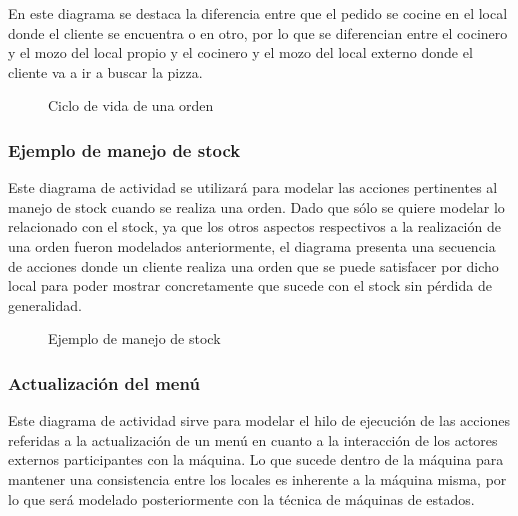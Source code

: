 \documentclass[a4paper,10pt]{article}
\begin{document}
En este diagrama se destaca la diferencia entre que el pedido se cocine en el local donde el cliente se encuentra o en otro, por lo que se 
diferencian entre el cocinero y el mozo del local propio y el cocinero y el mozo del local externo donde el cliente va a ir a buscar la pizza.

\begin{figure}[H]
\centering
{}
\caption{Ciclo de vida de una orden}
\end{figure}

\bigskip

\subsubsection*{Ejemplo de manejo de stock}

Este diagrama de actividad se utilizar\'a para modelar las acciones pertinentes al manejo de stock cuando se realiza una orden. Dado que sólo
se quiere modelar lo relacionado con el stock, ya que los otros aspectos respectivos a la realizaci\'on de una orden fueron modelados anteriormente,
el diagrama presenta una secuencia de acciones donde un cliente realiza una orden que se puede satisfacer por dicho local para poder mostrar concretamente
que sucede con el stock sin p\'erdida de generalidad.

\begin{figure}[H]
\centering
{}
\caption{Ejemplo de manejo de stock}
\end{figure}

\bigskip

\subsubsection*{Actualizaci\'on del men\'u}

Este diagrama de actividad sirve para modelar el hilo de ejecuci\'on de las acciones referidas a la actualizaci\'on de un men\'u en cuanto a la interacci\'on
de los actores externos participantes con la m\'aquina. Lo que sucede dentro de la m\'aquina para mantener una consistencia entre los locales es inherente
a la m\'aquina misma, por lo que ser\'a modelado posteriormente con la t\'ecnica de m\'aquinas de estados.
\end{document}
